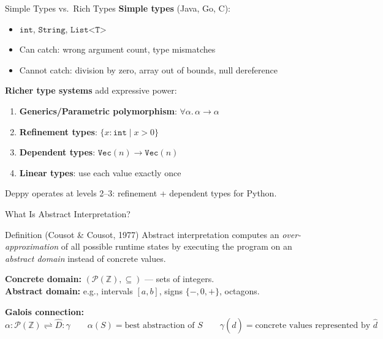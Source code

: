 \documentclass[aspectratio=169,10pt]{beamer}
\begin{document}
\begin{frame}{Simple Types vs.\ Rich Types}
\textbf{Simple types} (Java, Go, C):
\begin{itemize}
  \item $\texttt{int}$, $\texttt{String}$, $\texttt{List<T>}$
  \item Can catch: wrong argument count, type mismatches
  \item Cannot catch: division by zero, array out of bounds, null dereference
\end{itemize}

\vspace{0.5em}
\textbf{Richer type systems} add expressive power:
\begin{enumerate}
  \item \textbf{Generics/Parametric polymorphism}: $\forall \alpha.\, \alpha \to \alpha$
  \item \textbf{Refinement types}: $\{x : \texttt{int} \mid x > 0\}$
  \item \textbf{Dependent types}: $\texttt{Vec}(n) \to \texttt{Vec}(n)$
  \item \textbf{Linear types}: use each value exactly once
\end{enumerate}

\vspace{0.3em}
Deppy operates at levels 2--3: refinement + dependent types for Python.
\end{frame}

\begin{frame}{What Is Abstract Interpretation?}
\begin{block}{Definition (Cousot \& Cousot, 1977)}
Abstract interpretation computes an \emph{over-approximation} of all possible runtime states by executing the program on an \emph{abstract domain} instead of concrete values.
\end{block}

\vspace{0.3em}
\textbf{Concrete domain:} $(\mathcal{P}(\mathbb{Z}), \subseteq)$ --- sets of integers.\\
\textbf{Abstract domain:} e.g., intervals $[a, b]$, signs $\{-, 0, +\}$, octagons.

\vspace{0.5em}
\textbf{Galois connection:}
\[
\alpha : \mathcal{P}(\mathbb{Z}) \rightleftharpoons \widehat{D} : \gamma
\qquad
\alpha(S) = \text{best abstraction of } S
\qquad
\gamma(\hat{d}) = \text{concrete values represented by } \hat{d}
\]
\end{frame}
\end{document}
